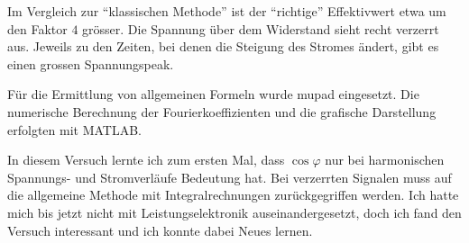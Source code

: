 \documentclass[notitlepage]{fhnwreport/fhnwreport}
\begin{document}
Im Vergleich zur ``klassischen Methode'' ist der  ``richtige'' Effektivwert etwa
um den Faktor $4$ gr\"osser. Die Spannung  \"uber  dem  Widerstand  sieht  recht
verzerrt  aus.  Jeweils  zu  den  Zeiten, bei denen  die  Steigung  des  Stromes
\"andert, gibt es einen grossen Spannungspeak.

F\"ur  die Ermittlung  von  allgemeinen  Formeln  wurde  mupad  eingesetzt.  Die
numerische Berechnung  der  Fourierkoeffizienten  und  die grafische Darstellung
erfolgten mit MATLAB.

In  diesem  Versuch  lernte  ich  zum ersten Mal,  dass  $\cos\varphi$  nur  bei
harmonischen  Spannungs-  und  Stromverl\"aufe  Bedeutung  hat.  Bei  verzerrten
Signalen    muss    auf    die   allgemeine   Methode   mit   Integralrechnungen
zur\"uckgegriffen werden. Ich hatte mich bis jetzt nicht mit Leistungselektronik
auseinandergesetzt, doch ich fand  den  Versuch interessant und ich konnte dabei
Neues lernen.
\end{document}
